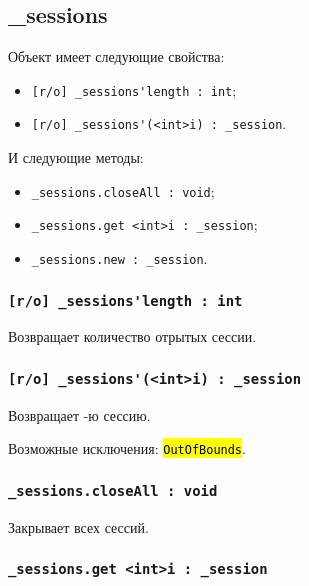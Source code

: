 \documentclass[a4paper, 14pt]{extarticle}
\newcommand{\ferror}[1]{\foreignlanguage{english}{\fontsize{11pt}{12pt}\tt{\sethlcolor{yellow}\hl{#1}}}}
\newenvironment{icItems}
	{ \begin{itemize} [noitemsep,nolistsep] }
	{ \end{itemize} }
\begin{document}

\subsection{{\color{orange} \_sessions}}

Объект \sessions{} имеет следующие свойства:
\begin{icItems}
	\item \lstinline|[r/o] _sessions'length : int|;
	\item \lstinline|[r/o] _sessions'(<int>i) : _session|.
\end{icItems}

И следующие методы:
\begin{icItems}
	\item \lstinline|_sessions.closeAll : void|;
	\item \lstinline|_sessions.get <int>i : _session|;
	\item \lstinline|_sessions.new : _session|.
\end{icItems}

\subsubsection{\lstinline|[r/o] _sessions'length : int|}

Возвращает количество отрытых сессии.

\subsubsection{\lstinline|[r/o] _sessions'(<int>i) : _session|}

Возвращает -ю сессию.

Возможные исключения: \ferror{OutOfBounds}.

\subsubsection{\lstinline|_sessions.closeAll : void|}

Закрывает всех сессий.

\subsubsection{\lstinline|_sessions.get <int>i : _session|}
\end{document}

